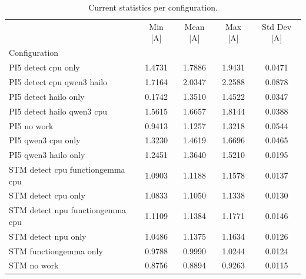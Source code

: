 \begin{table}[H]
\caption{Current statistics per configuration.}
\label{tab:current_stats}
\begin{tabular}{lcccc}
\toprule
 & Min [A] & Mean [A] & Max [A] & Std Dev [A] \\
Configuration &  &  &  &  \\
\midrule
PI5 detect cpu only & 1.4731 & 1.7886 & 1.9431 & 0.0471 \\
PI5 detect cpu qwen3 hailo & 1.7164 & 2.0347 & 2.2588 & 0.0878 \\
PI5 detect hailo only & 0.1742 & 1.3510 & 1.4522 & 0.0347 \\
PI5 detect hailo qwen3 cpu & 1.5615 & 1.6657 & 1.8144 & 0.0388 \\
PI5 no work & 0.9413 & 1.1257 & 1.3218 & 0.0544 \\
PI5 qwen3 cpu only & 1.3230 & 1.4619 & 1.6696 & 0.0465 \\
PI5 qwen3 hailo only & 1.2451 & 1.3640 & 1.5210 & 0.0195 \\
STM detect cpu functiongemma cpu & 1.0903 & 1.1188 & 1.1578 & 0.0137 \\
STM detect cpu only & 1.0833 & 1.1050 & 1.1338 & 0.0130 \\
STM detect npu functiongemma cpu & 1.1109 & 1.1384 & 1.1771 & 0.0146 \\
STM detect npu only & 1.0486 & 1.1375 & 1.1634 & 0.0126 \\
STM functiongemma only & 0.9788 & 0.9990 & 1.0244 & 0.0124 \\
STM no work & 0.8756 & 0.8894 & 0.9263 & 0.0115 \\
\bottomrule
\end{tabular}
\end{table}
